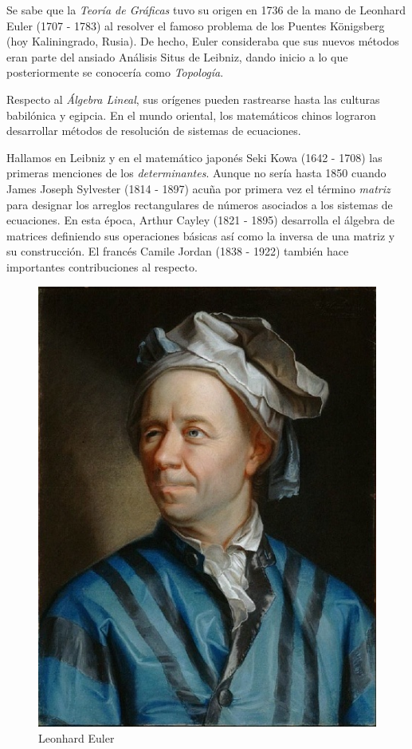 Se sabe que la \textit{Teoría de Gráficas} tuvo su origen en 1736 de la mano de Leonhard Euler (1707 - 1783) al resolver el famoso problema de los Puentes Königsberg (hoy Kaliningrado, Rusia). De hecho, Euler consideraba que sus nuevos métodos eran parte del ansiado Análisis Situs de Leibniz, dando inicio a lo que posteriormente se conocería como \textit{Topología}.

Respecto al \textit{Álgebra Lineal}, sus orígenes pueden rastrearse hasta las culturas babilónica y egipcia. En el mundo oriental, los matemáticos chinos lograron desarrollar métodos de resolución de sistemas de ecuaciones. 

Hallamos en Leibniz y en el matemático japonés Seki Kowa (1642 - 1708) las primeras menciones de los \textit{determinantes}. Aunque no sería hasta 1850 cuando James Joseph Sylvester (1814 - 1897) acuña por primera vez el término \textit{matriz} para designar los arreglos rectangulares de números asociados a los sistemas de ecuaciones. En esta época, Arthur Cayley (1821 - 1895) desarrolla el álgebra de matrices definiendo sus operaciones básicas así como la inversa de una matriz y su construcción. El francés Camile Jordan (1838 - 1922) también hace importantes contribuciones al respecto.

\begin{figure}
    \vspace{-0.4cm}
    \centering
    \includegraphics[scale=0.4]{img/imgintro/euler.jpg}
    \caption{Leonhard Euler}
    \label{fig:euler}   
\vspace{-0.3cm}
\end{figure}


